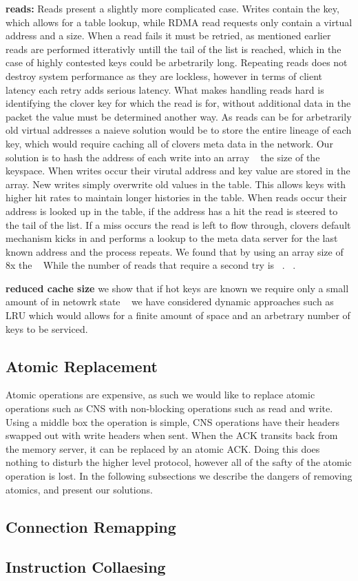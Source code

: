 \textbf{reads:} Reads present a slightly more complicated case. Writes contain
the key, which allows for a table lookup, while RDMA read requests only contain
a virtual address and a size. When a read fails it must be retried, as mentioned
earlier reads are performed itterativly untill the tail of the list is reached,
which in the case of highly contested keys could be arbetrarily long. Repeating
reads does not destroy system performance as they are lockless, however in terms
of client latency each retry adds serious latency. What makes handling reads
hard is identifying the clover key for which the read is for, without additional
data in the packet the value must be determined another way. As reads can be for
arbetrarily old virtual addresses a naieve solution would be to store the entire
lineage of each key, which would require caching all of clovers meta data in the
network. Our solution is to hash the address of each write into an array
~ the size of the keyspace. When writes occur their virutal address and
key value are stored in the array. New writes simply overwrite old values in the
table. This allows keys with higher hit rates to maintain longer histories in
the table. When reads occur their address is looked up in the table, if the
address has a hit the read is steered to the tail of the list. If a miss occurs
the read is left to flow through, clovers default mechanism kicks in and
performs a lookup to the meta data server for the last known address and the
process repeats. We found that by using an array size of 8x the ~ While the number of reads that require a
second try is ~. ~.

\textbf{reduced cache size} we show that if hot keys are known we require only a
small amount of in netowrk state ~ we have considered dynamic
approaches such as LRU which would allows for a finite amount of space and an
arbetrary number of keys to be serviced.

\subsection{Atomic Replacement} Atomic operations are expensive, as such we
would like to replace atomic operations such as CNS with non-blocking operations
such as read and write. Using a middle box the operation is simple, CNS
operations have their headers swapped out with write headers when sent. When the
ACK transits back from the memory server, it can be replaced by an atomic ACK.
Doing this does nothing to disturb the higher level protocol, however all of the
safty of the atomic operation is lost. In the following subsections we describe
the dangers of removing atomics, and present our solutions.

\subsection{Connection Remapping}

\subsection{Instruction Collaesing}
